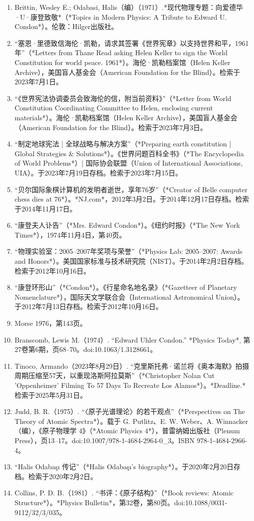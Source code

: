 \begin{enumerate}
\item Brittin, Wesley E.; Odabasi, Halis（编）（1971）.*现代物理专题：向爱德华·U·康登致敬*（*Topics in Modern Physics: A Tribute to Edward U. Condon*）。伦敦：Hilger出版社。
\item “塞恩·里德致信海伦·凯勒，请求其签署《世界宪章》以支持世界和平，1961年”（*Letters from Thane Read asking Helen Keller to sign the World Constitution for world peace. 1961*）。海伦·凯勒档案馆（Helen Keller Archive），美国盲人基金会（American Foundation for the Blind）。检索于2023年7月1日。
\item “《世界宪法协调委员会致海伦的信，附当前资料》”（*Letter from World Constitution Coordinating Committee to Helen, enclosing current materials*）。海伦·凯勒档案馆（Helen Keller Archive），美国盲人基金会（American Foundation for the Blind）。检索于2023年7月3日。
\item “制定地球宪法 | 全球战略与解决方案”（*Preparing earth constitution | Global Strategies & Solutions*）。《世界问题百科全书》（*The Encyclopedia of World Problems*）| 国际协会联盟（Union of International Associations, UIA）。于2023年7月19日存档。检索于2023年7月15日。
\item “贝尔国际象棋计算机的发明者逝世，享年76岁”（*Creator of Belle computer chess dies at 76*）。*NJ.com*，2012年3月2日。于2014年12月17日存档。检索于2014年11月17日。
\item “康登夫人讣告”（*Mrs. Edward Condon*）。《纽约时报》（*The New York Times*），1974年11月4日，第40页。
\item “物理实验室：2005–2007年奖项与荣誉”（*Physics Lab: 2005–2007: Awards and Honors*）。美国国家标准与技术研究院（NIST）。于2014年2月2日存档。检索于2012年10月16日。
\item “康登环形山”（*Condon*）。《行星命名地名录》（*Gazetteer of Planetary Nomenclature*），国际天文学联合会（International Astronomical Union）。于2012年7月13日存档。检索于2012年10月16日。
\item Morse 1976，第143页。
\item Branscomb, Lewis M.（1974）. “Edward Uhler Condon.” *Physics Today*, 第27卷第6期，页68–70。doi:10.1063/1.3128661。
\item Tinoco, Armando（2023年8月29日）. “克里斯托弗·诺兰将《奥本海默》拍摄周期压缩至57天，以重现洛斯阿拉莫斯”（*Christopher Nolan Cut 'Oppenheimer' Filming To 57 Days To Recreate Los Alamos*）。*Deadline.* 检索于2025年5月31日。
\item Judd, B. R.（1975）. “〈原子光谱理论〉的若干观点”（*Perspectives on The Theory of Atomic Spectra*）。载于 G. Putlitz、E. W. Weber、A. Winnacker（编），《原子物理学 4》（*Atomic Physics 4*），普雷纳姆出版社（Plenum Press），页13–17。doi:10.1007/978-1-4684-2964-0_3。ISBN 978-1-4684-2966-4。
\item “Halis Odabaşı 传记”（*Halis Odabaşı's biography*）。于2020年2月20日存档。检索于2020年2月2日。
\item Collins, P. D. B.（1981）. “书评：《原子结构》”（*Book reviews: Atomic Structure*）。*Physics Bulletin*，第32卷，第80页。doi:10.1088/0031-9112/32/3/035。

\end{enumerate}